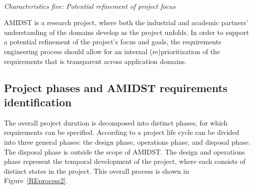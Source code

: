 \ \\
\noindent \emph{Characteristics five: Potential refinement of project focus}
\label{sec:characteristic5}

AMIDST is a research project, where both the industrial and academic partners' understanding of the domains develop as
the project unfolds. In order to support a potential refinement of the project's focus and goals, the requirements
engineering process should allow for an internal (re)prioritization of the requirements that is transparent across
application domains.    





\subsection{Project phases and AMIDST requirements identification }


The overall project duration is decomposed into distinct phases, for which requirements can be specified. According to
\cite{Eig09} a project life cycle can be divided into three general phases: the design phase, operations phase, and
disposal phase. The disposal phase is outside the scope of AMIDST. The design and operations phase represent the
temporal development of the project, where each consists of distinct states in the project. This overall process is
shown in Figure~\ref{REprocess2}. 


